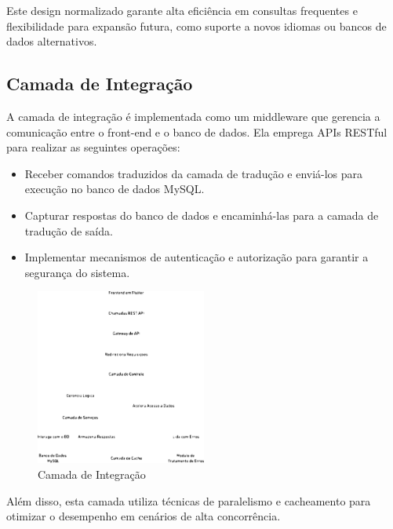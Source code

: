 
Este design normalizado garante alta eficiência em consultas frequentes e flexibilidade para expansão futura, como suporte a novos idiomas ou bancos de dados alternativos.

\subsection{Camada de Integração}
A camada de integração é implementada como um middleware que gerencia a comunicação entre o front-end e o banco de dados. Ela emprega APIs RESTful para realizar as seguintes operações:

\begin{itemize}
    \item Receber comandos traduzidos da camada de tradução e enviá-los para execução no banco de dados MySQL.
    \item Capturar respostas do banco de dados e encaminhá-las para a camada de tradução de saída.
    \item Implementar mecanismos de autenticação e autorização para garantir a segurança do sistema.
\end{itemize}

\begin{figure}
    \centering
    \includegraphics[width=0.5\textwidth]{figuras/mid.eps}
    \caption{Camada de Integração}
    \label{fig:Camada de Integração}
\end{figure}

Além disso, esta camada utiliza técnicas de paralelismo e cacheamento para otimizar o desempenho em cenários de alta concorrência.

